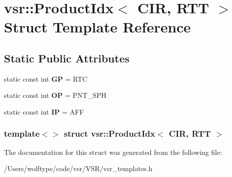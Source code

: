 \hypertarget{structvsr_1_1_product_idx_3_01_c_i_r_00_01_r_t_t_01_4}{\section{vsr\-:\-:Product\-Idx$<$ C\-I\-R, R\-T\-T $>$ Struct Template Reference}
\label{structvsr_1_1_product_idx_3_01_c_i_r_00_01_r_t_t_01_4}
}
\subsection*{Static Public Attributes}
\begin{DoxyCompactItemize}
\item 
\hypertarget{structvsr_1_1_product_idx_3_01_c_i_r_00_01_r_t_t_01_4_ad8d903bb83412e515739f0440c3ab623}{static const int {\bfseries G\-P} = R\-T\-C}\label{structvsr_1_1_product_idx_3_01_c_i_r_00_01_r_t_t_01_4_ad8d903bb83412e515739f0440c3ab623}

\item 
\hypertarget{structvsr_1_1_product_idx_3_01_c_i_r_00_01_r_t_t_01_4_aa1391c60e0ad6e1c7ce08f49b61cd57b}{static const int {\bfseries O\-P} = P\-N\-T\-\_\-\-S\-P\-H}\label{structvsr_1_1_product_idx_3_01_c_i_r_00_01_r_t_t_01_4_aa1391c60e0ad6e1c7ce08f49b61cd57b}

\item 
\hypertarget{structvsr_1_1_product_idx_3_01_c_i_r_00_01_r_t_t_01_4_ab644b1bb887866a36f55c2f01dc6a621}{static const int {\bfseries I\-P} = A\-F\-F}\label{structvsr_1_1_product_idx_3_01_c_i_r_00_01_r_t_t_01_4_ab644b1bb887866a36f55c2f01dc6a621}

\end{DoxyCompactItemize}
\subsubsection*{template$<$$>$ struct vsr\-::\-Product\-Idx$<$ C\-I\-R, R\-T\-T $>$}



The documentation for this struct was generated from the following file\-:\begin{DoxyCompactItemize}
\item 
/\-Users/wolftype/code/vsr/\-V\-S\-R/vsr\-\_\-templates.\-h\end{DoxyCompactItemize}
